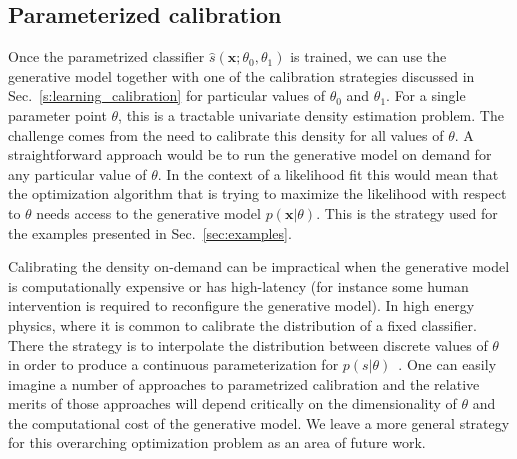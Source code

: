 \documentclass[12pt]{article}
\numberwithin{equation}{section}
\theoremstyle{plain}
\begin{document}
\subsection{Parameterized calibration}
\label{sec:param-calibration}



Once the parametrized classifier $\hat{s}(\mathbf{x}; \theta_0, \theta_1)$ is trained,
we can use the generative model together with one of the calibration strategies
discussed in Sec.~\ref{s:learning_calibration} for particular values of $\theta_0$ and $\theta_1$.
For a single parameter point $\theta$, this is a tractable univariate density
estimation problem. The challenge comes from the need to calibrate this density
for all values of $\theta$. A straightforward approach would be to run the
generative model on demand for any particular value of $\theta$. In the context
of a likelihood fit this would mean that the optimization algorithm that is
trying to maximize the likelihood with respect to $\theta$ needs access to the
generative model $p(\mathbf{x}|\theta)$.  This is the strategy used for the examples presented in Sec.~\ref{sec:examples}.

Calibrating the density on-demand can be  impractical when the generative
model is computationally expensive or has high-latency (for instance some human
intervention is required to reconfigure the generative model). In high energy physics, where
it is common to calibrate the distribution of a fixed classifier. There the strategy is to interpolate
the distribution between discrete values of $\theta$ in order to produce a continuous parameterization for
$p(s | \theta)$~\citep{read1999linear,Cranmer:2012sba,baak2015interpolation}.
One can easily imagine a number of approaches to parametrized calibration and the
relative merits of those approaches will depend critically on the dimensionality of $\theta$ and the
computational cost of the generative model. We leave a more general strategy for
this overarching optimization problem as an area of future work.

\end{document}
